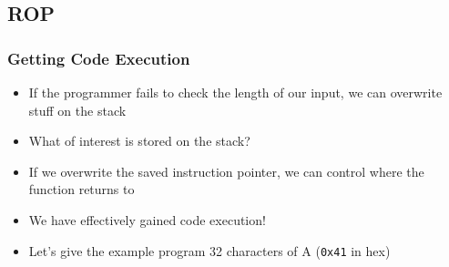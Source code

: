\documentclass[aspectratio=169]{beamer}
\newcommand{\hex}[1]{\texttt{0x#1}}
\begin{document}
\subsection{ROP}
\begin{frame}
    \frametitle{Getting Code Execution}
    \begin{itemize}
        \item If the programmer fails to check the length of our input, we can overwrite stuff on the stack
        \item What of interest is stored on the stack?
        \pause
        \item If we overwrite the saved instruction pointer, we can control where the function returns to
        \item We have effectively gained code execution!
        \item Let's give the example program 32 characters of A (\hex{41} in hex)
    \end{itemize}

\end{frame}
\end{document}
